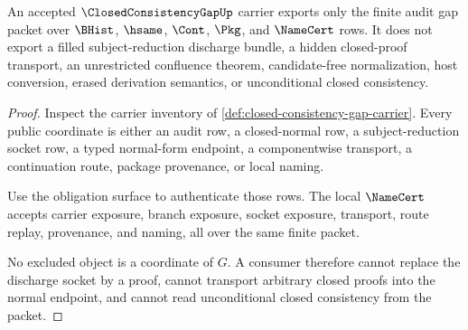 \begin{theorem}
\label{thm:closed-consistency-gap-non-escape}
An accepted $\ClosedConsistencyGapUp$ carrier exports only the finite audit gap packet over $\BHist$, $\hsame$, $\Cont$, $\Pkg$, and $\NameCert$ rows. It does not export a filled subject-reduction discharge bundle, a hidden closed-proof transport, an unrestricted confluence theorem, candidate-free normalization, host conversion, erased derivation semantics, or unconditional closed consistency.
\end{theorem}
\begin{proof}
Inspect the carrier inventory of \autoref{def:closed-consistency-gap-carrier}. Every public coordinate is either an audit row, a closed-normal row, a subject-reduction socket row, a typed normal-form endpoint, a componentwise transport, a continuation route, package provenance, or local naming.

Use the obligation surface to authenticate those rows. The local $\NameCert$ accepts carrier exposure, branch exposure, socket exposure, transport, route replay, provenance, and naming, all over the same finite packet.

No excluded object is a coordinate of $G$. A consumer therefore cannot replace the discharge socket by a proof, cannot transport arbitrary closed proofs into the normal endpoint, and cannot read unconditional closed consistency from the packet.
\end{proof}


\begin{closurestatus}{\ClosedConsistencyGapUp}
  \theoryclosure{\seedClosure}
  \formalstatus{\unformalizedV}
\end{closurestatus}
